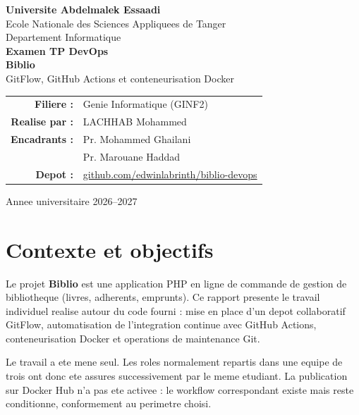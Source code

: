 \documentclass[11pt,a4paper]{article}
\begin{document}
\begin{titlepage}
  \centering
  \vspace*{1.2cm}

  {\large \textbf{Universite Abdelmalek Essaadi}}\\[0.3cm]
  {\large Ecole Nationale des Sciences Appliquees de Tanger}\\[0.2cm]
  {\large Departement Informatique}\\[1.4cm]

  {\Large \textbf{Examen TP DevOps}}\\[0.5cm]
  {\LARGE \textbf{Biblio}}\\[0.4cm]
  {\large GitFlow, GitHub Actions et conteneurisation Docker}\\[1.8cm]

  \begin{tabular}{rl}
    \textbf{Filiere :} & Genie Informatique (GINF2)\\
    \textbf{Realise par :} & LACHHAB Mohammed\\
    \textbf{Encadrants :} & Pr. Mohammed Ghailani\\
                         & Pr. Marouane Haddad\\
    \textbf{Depot :} & \href{https://github.com/edwinlabrinth/biblio-devops}{github.com/edwinlabrinth/biblio-devops}\\
  \end{tabular}

  \vfill
  {\large Annee universitaire 2026--2027}
\end{titlepage}

\tableofcontents
\newpage

\section{Contexte et objectifs}

Le projet \textbf{Biblio} est une application PHP en ligne de commande de gestion
de bibliotheque (livres, adherents, emprunts). Ce rapport presente le travail
individuel realise autour du code fourni : mise en place d'un depot
collaboratif GitFlow, automatisation de l'integration continue avec GitHub
Actions, conteneurisation Docker et operations de maintenance Git.

Le travail a ete mene seul. Les roles normalement repartis dans une equipe de
trois ont donc ete assures successivement par le meme etudiant. La publication
sur Docker Hub n'a pas ete activee : le workflow correspondant existe mais reste
conditionne, conformement au perimetre choisi.
\end{document}
